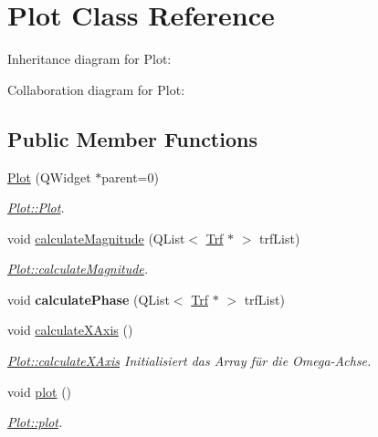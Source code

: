 \hypertarget{classPlot}{}\section{Plot Class Reference}
\label{classPlot}


Inheritance diagram for Plot\+:


Collaboration diagram for Plot\+:
\subsection*{Public Member Functions}
\begin{DoxyCompactItemize}
\item 
\hyperlink{classPlot_acb95c0d3a6d1d4edf7b946863efdac98}{Plot} (Q\+Widget $\ast$parent=0)
\begin{DoxyCompactList}\small\item\em \hyperlink{classPlot_acb95c0d3a6d1d4edf7b946863efdac98}{Plot\+::\+Plot}. \end{DoxyCompactList}\item 
void \hyperlink{classPlot_a1c6fda8fe644da0e0f0df6bf659455de}{calculate\+Magnitude} (Q\+List$<$ \hyperlink{classTrf}{Trf} $\ast$ $>$ trf\+List)
\begin{DoxyCompactList}\small\item\em \hyperlink{classPlot_a1c6fda8fe644da0e0f0df6bf659455de}{Plot\+::calculate\+Magnitude}. \end{DoxyCompactList}\item 
\hypertarget{classPlot_afaf47513d7e2390b1c51df94a43a025e}{}void {\bfseries calculate\+Phase} (Q\+List$<$ \hyperlink{classTrf}{Trf} $\ast$ $>$ trf\+List)\label{classPlot_afaf47513d7e2390b1c51df94a43a025e}

\item 
\hypertarget{classPlot_a0a85fd66f164e906708074112bd2d997}{}void \hyperlink{classPlot_a0a85fd66f164e906708074112bd2d997}{calculate\+X\+Axis} ()\label{classPlot_a0a85fd66f164e906708074112bd2d997}

\begin{DoxyCompactList}\small\item\em \hyperlink{classPlot_a0a85fd66f164e906708074112bd2d997}{Plot\+::calculate\+X\+Axis} Initialisiert das Array für die Omega-\/\+Achse. \end{DoxyCompactList}\item 
void \hyperlink{classPlot_a8fae6078f872f751aa80d1f037266438}{plot} ()
\begin{DoxyCompactList}\small\item\em \hyperlink{classPlot_a8fae6078f872f751aa80d1f037266438}{Plot\+::plot}. \end{DoxyCompactList}\end{DoxyCompactItemize}
